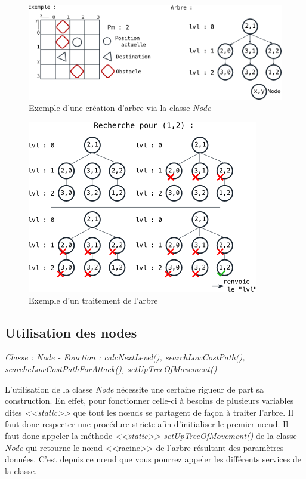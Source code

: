 \documentclass[a4paper,11pt]{report}
\begin{document}
          \begin{figure}[th]
          \begin{center}
            \includegraphics[scale=0.6]{Assets/treeExample.png}
            \caption{Exemple d'une création d'arbre via la classe \textit{Node}}
            \label{treeExample}
          \end{center}
        \end{figure}
            
        \begin{figure}[th]
          \begin{center}
            \includegraphics[scale=0.6]{Assets/parcourTree.png}
            \caption{Exemple d'un traitement de l'arbre}
            \label{parcourExample}
          \end{center}
        \end{figure}
        

      
        \subsection{Utilisation des nodes}
        \begin{center}
          \textit{Classe : Node - Fonction : calcNextLevel(), searchLowCostPath(), searcheLowCostPathForAttack(), setUpTreeOfMovement()}
        \end{center}
          L'utilisation de la classe \textit{Node} nécessite une certaine rigueur de part sa construction. En effet, pour fonctionner celle-ci à besoins de plusieurs variables dites \textit{<<static>>} que tout les nœuds se partagent de façon à traiter l'arbre. Il faut donc respecter une procédure stricte afin d'initialiser le premier nœud. Il faut donc appeler la méthode \textit{<<static>> setUpTreeOfMovement()} de la classe \textit{Node} qui retourne le nœud <<racine>> de l'arbre résultant des paramètres données. C'est depuis ce nœud que vous pourrez appeler les différents services de la classe.
        
\end{document}
